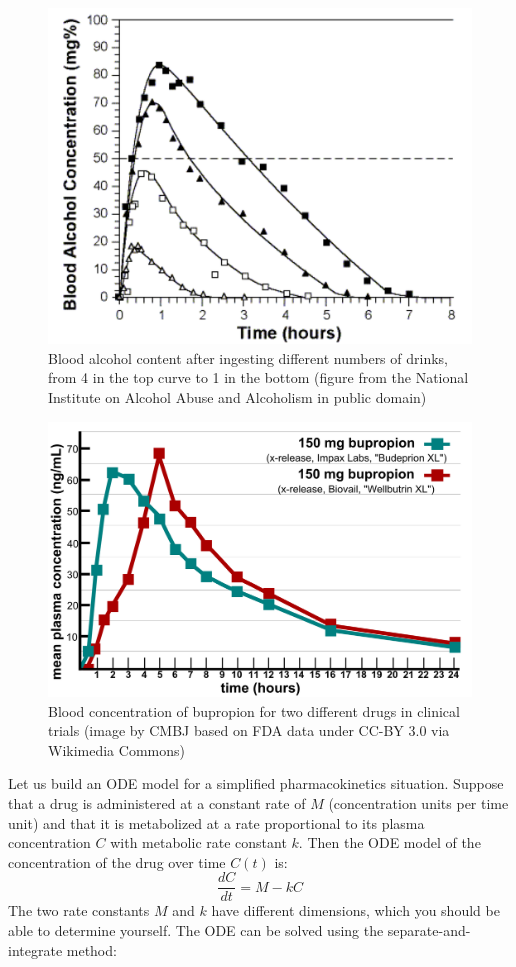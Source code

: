 \documentclass[
]{book}
\theoremstyle{definition}
\theoremstyle{definition}
\theoremstyle{definition}
\theoremstyle{remark}
\begin{document}
\begin{figure}
\centering
\includegraphics{ch15/aa35graf.png}
\caption{Blood alcohol content after ingesting different numbers of drinks, from 4 in the top curve to 1 in the bottom (figure from the National Institute on Alcohol Abuse and Alcoholism in public domain)}
\end{figure}

\begin{figure}
\centering
\includegraphics{ch15/2000px-Bupropion_bioequivalency.png}
\caption{Blood concentration of bupropion for two different drugs in clinical trials (image by CMBJ based on FDA data under CC-BY 3.0 via Wikimedia Commons)}
\end{figure}

Let us build an ODE model for a simplified pharmacokinetics situation. Suppose that a drug is administered at a constant rate of \(M\) (concentration units per time unit) and that it is metabolized at a rate proportional to its plasma concentration \(C\) with metabolic rate constant \(k\). Then the ODE model of the concentration of the drug over time \(C(t)\) is:
\[ \frac{dC}{dt} = M - kC\]
The two rate constants \(M\) and \(k\) have different dimensions, which you should be able to determine yourself. The ODE can be solved using the separate-and-integrate method:
\end{document}
